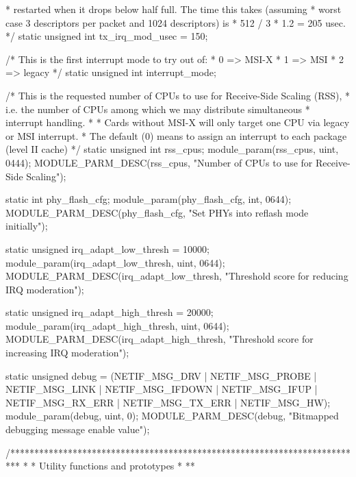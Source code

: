 
 * restarted when it drops below half full.  The time this takes (assuming
 * worst case 3 descriptors per packet and 1024 descriptors) is
 *   512 / 3 * 1.2 = 205 usec.
 */
static unsigned int tx_irq_mod_usec = 150;

/* This is the first interrupt mode to try out of:
 * 0 => MSI-X
 * 1 => MSI
 * 2 => legacy
 */
static unsigned int interrupt_mode;

/* This is the requested number of CPUs to use for Receive-Side Scaling (RSS),
 * i.e. the number of CPUs among which we may distribute simultaneous
 * interrupt handling.
 *
 * Cards without MSI-X will only target one CPU via legacy or MSI interrupt.
 * The default (0) means to assign an interrupt to each package (level II cache)
 */
static unsigned int rss_cpus;
module_param(rss_cpus, uint, 0444);
MODULE_PARM_DESC(rss_cpus, "Number of CPUs to use for Receive-Side Scaling");

static int phy_flash_cfg;
module_param(phy_flash_cfg, int, 0644);
MODULE_PARM_DESC(phy_flash_cfg, "Set PHYs into reflash mode initially");

static unsigned irq_adapt_low_thresh = 10000;
module_param(irq_adapt_low_thresh, uint, 0644);
MODULE_PARM_DESC(irq_adapt_low_thresh,
		 "Threshold score for reducing IRQ moderation");

static unsigned irq_adapt_high_thresh = 20000;
module_param(irq_adapt_high_thresh, uint, 0644);
MODULE_PARM_DESC(irq_adapt_high_thresh,
		 "Threshold score for increasing IRQ moderation");

static unsigned debug = (NETIF_MSG_DRV | NETIF_MSG_PROBE |
			 NETIF_MSG_LINK | NETIF_MSG_IFDOWN |
			 NETIF_MSG_IFUP | NETIF_MSG_RX_ERR |
			 NETIF_MSG_TX_ERR | NETIF_MSG_HW);
module_param(debug, uint, 0);
MODULE_PARM_DESC(debug, "Bitmapped debugging message enable value");

/**************************************************************************
 *
 * Utility functions and prototypes
 *
 **